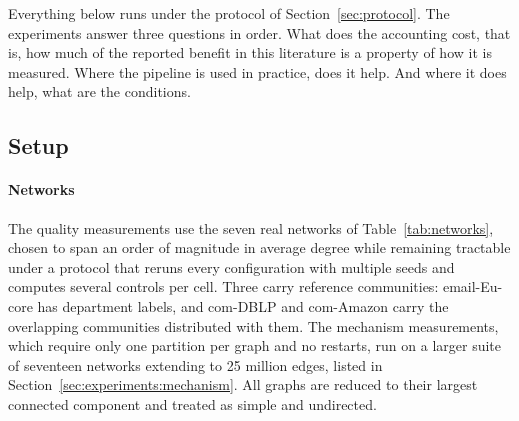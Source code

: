 %
%

Everything below runs under the protocol of Section~\ref{sec:protocol}. The
experiments answer three questions in order. What does the accounting cost, that
is, how much of the reported benefit in this literature is a property of how it
is measured. Where the pipeline is used in practice, does it help. And where it
does help, what are the conditions.

\subsection{Setup}\label{sec:experiments:setup}

\paragraph{Networks}
The quality measurements use the seven real networks of Table~\ref{tab:networks},
chosen to span an order of magnitude in average degree while remaining tractable
under a protocol that reruns every configuration with multiple seeds and computes
several controls per cell. Three carry reference communities: email-Eu-core has
department labels, and com-DBLP and com-Amazon carry the overlapping communities
distributed with them. The mechanism measurements, which require only one
partition per graph and no restarts, run on a larger suite of seventeen networks
extending to 25 million edges, listed in
Section~\ref{sec:experiments:mechanism}.
All graphs are reduced to their largest connected component and treated as
simple and undirected.


